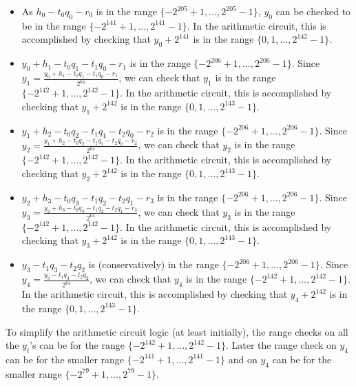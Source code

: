 \documentclass[a4paper, 12pt]{article}
\begin{document}
\begin{itemize}
  \item As $h_0 - t_0q_0-r_0$ is in the range $\{-2^{205}+1,\ldots, 2^{205}-1\}$, $y_0$ can be checked to be in the range $\{-2^{141}+1,\ldots, 2^{141}-1\}$. In the arithmetic circuit, this is accomplished by checking that $y_0 + 2^{141}$ is in the range $\{0,1,\ldots,2^{142}-1\}$.
  \item $y_0+h_1-t_0q_1-t_1q_0-r_1$ is in the range $\{-2^{206}+1,\ldots, 2^{206}-1\}$. Since $y_1 = \frac{y_0+h_1-t_0q_1-t_1q_0-r_1}{2^{64}}$, we can check that $y_1$ is in the range $\{-2^{142}+1,\ldots, 2^{142}-1\}$. In the arithmetic circuit, this is accomplished by checking that $y_1 + 2^{142}$ is in the range $\{0,1,\ldots,2^{143}-1\}$.
  \item $y_1+h_2-t_0q_2-t_1q_1-t_2q_0-r_2$ is in the range $\{-2^{206}+1,\ldots, 2^{206}-1\}$. Since $y_2 = \frac{y_1+h_2-t_0q_2-t_1q_1-t_2q_0-r_2}{2^{64}}$, we can check that $y_2$ is in the range $\{-2^{142}+1,\ldots, 2^{142}-1\}$. In the arithmetic circuit, this is accomplished by checking that $y_2 + 2^{142}$ is in the range $\{0,1,\ldots,2^{143}-1\}$.
  \item $y_2+h_3-t_0q_3-t_1q_2-t_2q_1-r_3$ is in the range $\{-2^{206}+1,\ldots, 2^{206}-1\}$. Since $y_3 = \frac{y_2+h_3-t_0q_3-t_1q_2-t_2q_1-r_3}{2^{64}}$, we can check that $y_3$ is in the range $\{-2^{142}+1,\ldots, 2^{142}-1\}$. In the arithmetic circuit, this is accomplished by checking that $y_3 + 2^{142}$ is in the range $\{0,1,\ldots,2^{143}-1\}$.
  \item $y_3-t_1q_3-t_2q_2$ is (conservatively) in the range $\{-2^{206}+1,\ldots, 2^{206}-1\}$. Since $y_4 = \frac{y_3-t_1q_3-t_2q_2}{2^{64}}$, we can check that $y_4$ is in the range $\{-2^{142}+1,\ldots, 2^{142}-1\}$. In the arithmetic circuit, this is accomplished by checking that $y_4 + 2^{142}$ is in the range $\{0,1,\ldots,2^{143}-1\}$.
\end{itemize}
To simplify the arithmetic circuit logic (at least initially), the range checks on all the $y_i$'s can be for the range $\{-2^{142}+1,\ldots, 2^{142}-1\}$. Later the range check on $y_4$ can be for the smaller range $\{-2^{141}+1,\ldots,2^{141}-1\}$ and on $y_4$ can be for the smaller range $\{-2^{79}+1,\ldots,2^{79}-1\}$.
\end{document}
